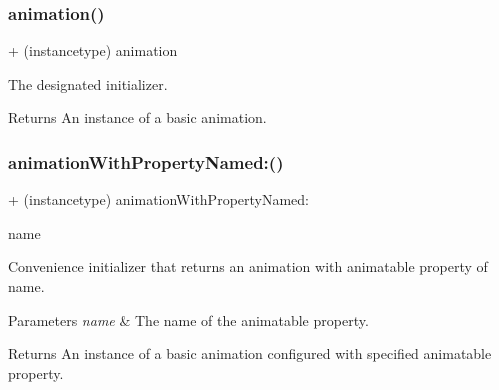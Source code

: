 \subsubsection{\texorpdfstring{animation()}{animation()}\hspace{0.1cm}{\footnotesize\ttfamily [3/3]}}
{\footnotesize\ttfamily + (instancetype) animation \begin{DoxyParamCaption}{ }\end{DoxyParamCaption}}

The designated initializer. \begin{DoxyReturn}{Returns}
An instance of a basic animation. 
\end{DoxyReturn}
\mbox{\label{interface_p_o_p_basic_animation_aa6332608f15c63f9ca6837fd595a2032}} 
\subsubsection{\texorpdfstring{animation\+With\+Property\+Named\+:()}{animationWithPropertyNamed:()}\hspace{0.1cm}{\footnotesize\ttfamily [1/3]}}
{\footnotesize\ttfamily + (instancetype) animation\+With\+Property\+Named\+: \begin{DoxyParamCaption}\item[{(N\+S\+String $\ast$)}]{name }\end{DoxyParamCaption}}

Convenience initializer that returns an animation with animatable property of name. 
\begin{DoxyParams}{Parameters}
{\em name} & The name of the animatable property. \\
\hline
\end{DoxyParams}
\begin{DoxyReturn}{Returns}
An instance of a basic animation configured with specified animatable property. 
\end{DoxyReturn}
\mbox{\label{interface_p_o_p_basic_animation_aa6332608f15c63f9ca6837fd595a2032}} 
